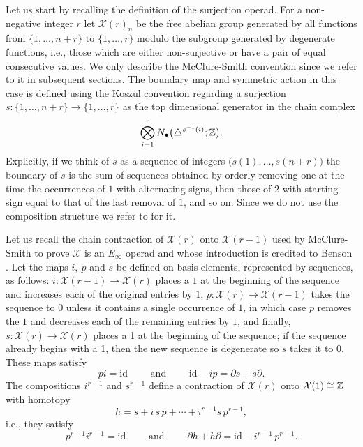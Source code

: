Let us start by recalling the definition of the surjection operad.
For a non-negative integer $r$ let $\mathcal X(r)_n$ be the free abelian group generated by all functions from $\{1, \dots, n+r\}$ to $\{1, \dots, r\}$ modulo the subgroup generated by degenerate functions, i.e., those which are either non-surjective or have a pair of equal consecutive values.
We only describe the McClure-Smith convention since we refer to it in subsequent sections.
The boundary map and symmetric action in this case is defined using the Koszul convention regarding a surjection $s \colon \{1, \dots, n+r\} \to \{1, \dots, r\} $ as the top dimensional generator in the chain complex
\begin{equation} \label{eq: surjection boundary}
\bigotimes_{i = 1}^r N_\bullet \big( \triangle^{s^{-1}(i)}; \mathbb{Z} \big).
\end{equation}
Explicitly, if we think of $s$ as a sequence of integers $\big( s(1), \dots, s(n+r) \big)$ the boundary of $s$ is the sum of sequences obtained by orderly removing one at the time the occurrences of $1$ with alternating signs, then those of $2$ with starting sign equal to that of the last removal of $1$, and so on.
Since we do not use the composition structure we refer to \cite{mcclure03cochain} for it.

Let us recall the chain contraction of $\mathcal X(r)$ onto $\mathcal X(r-1)$ used by McClure-Smith to prove $\mathcal X$ is an $E_\infty$ operad and whose introduction is credited to Benson \cite{benson1998rep}.
Let the maps $i,\ p$ and $s$ be defined on basis elements, represented by sequences, as follows: $i \colon \mathcal X(r-1) \to \mathcal X(r)$ places a $1$ at the beginning of the sequence and increases each of the original entries by $1$, $p \colon \mathcal X(r) \to \mathcal X(r-1)$ takes the sequence to $0$ unless it contains a single occurrence of $1$, in which case $p$ removes the $1$ and decreases each of the remaining entries by $1$, and finally, $s \colon \mathcal X(r) \to \mathcal X(r)$ places a 1 at the beginning of the sequence; if the sequence already begins
with a 1, then the new sequence is degenerate so $s$ takes it to $0$.
These maps satisfy
\begin{equation*}
p i = \mathrm{id}
\qquad \text{ and } \qquad
\mathrm{id} - i  p = \partial s + s \partial.
\end{equation*}
The compositions $i^{r-1}$ and $s^{r-1}$ define a contraction of $\mathcal X(r)$ onto $\mathcal X(1) \cong \mathbb{Z}$ with homotopy
\begin{equation*}
h = s + i\, s\, p + \cdots + i^{r-1} s\, p^{r-1},
\end{equation*}
i.e., they satisfy
\begin{equation*}
p^{r-1} i^{r-1} = \mathrm{id}
\qquad \text{ and } \qquad
\partial h + h \partial = \mathrm{id} - i^{r-1}\,p^{r-1}.
\end{equation*}

